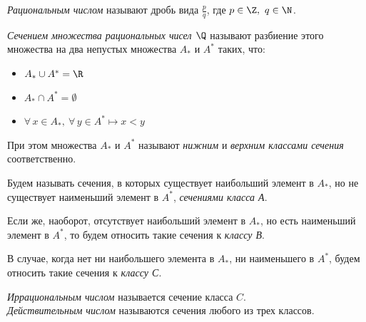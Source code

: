 \setcounter{section}{0}



\begin{definition}
    \textit{Рациональным числом} называют дробь вида \(\frac{p}{q}\), где \(p\in\Z,~q\in\N\). 
\end{definition}

\begin{definition}
    \textit{Сечением множества рациональных чисел \(\Q\)} называют
    разбиение этого множества на два непустых множества \(A_{*}\) и \(A^{*}\) таких, что:
    \begin{itemize}
        \item \(A_{*}\cup A^{*}=\R\) 
        \item \(A_{*}\cap A^{*}=\emptyset\)
        \item \(\forall\, x\in A_{*},~\forall\,y\in A^{*}\longmapsto x < y\)
    \end{itemize}
    При этом множества \(A_{*}\) и \(A^{*}\) называют
    \textit{нижним} и \textit{верхним классами сечения} соответственно. 
\end{definition}

\begin{notation}
    Будем называть сечения, в которых существует наибольший элемент в \(A_{*}\), 
    но не существует наименьший элемент в \(A^{*}\), \textit{сечениями класса А}.

    \vspace{2mm}

    Если же, наоборот, отсутствует наибольший элемент в \(A_{*}\), но есть наименьший
     элемент в \(A^{*}\), то будем относить такие сечения к \textit{классу В}.

     \vspace{2mm}

    В случае, когда нет ни наибольшего элемента в \(A_{*}\), ни наименьшего в \(A^{*}\),
    будем относить такие сечения к \textit{классу С}.
\end{notation}

\begin{definition}
    \textit{Иррациональным числом} называется сечение класса \(C\). \\
    \textit{Действительным числом} называются сечения любого из трех классов.
\end{definition}


